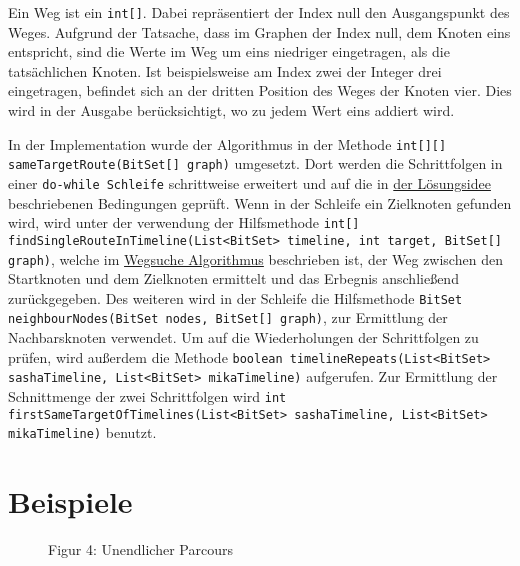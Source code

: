 \documentclass[a4paper,10pt,ngerman]{scrartcl}
\begin{document}
    Ein Weg ist ein \texttt{int[]}.
    Dabei repräsentiert der Index null den Ausgangspunkt des Weges.
    Aufgrund der Tatsache, dass im Graphen der Index null, dem Knoten eins entspricht,
    sind die Werte im Weg um eins niedriger eingetragen, als die tatsächlichen Knoten.
    Ist beispielsweise am Index zwei der Integer drei eingetragen,
    befindet sich an der dritten Position des Weges der Knoten vier.
    Dies wird in der Ausgabe berücksichtigt, wo zu jedem Wert eins addiert wird.

    In der Implementation wurde der Algorithmus in der Methode
    \texttt{int[][] sameTargetRoute(BitSet[] graph)} umgesetzt.
    Dort werden die Schrittfolgen in einer \texttt{do-while Schleife} schrittweise erweitert
    und auf die in \hyperref[sec:losungsidee]{der Lösungsidee} beschriebenen Bedingungen geprüft.
    Wenn in der Schleife ein Zielknoten gefunden wird, wird unter der verwendung der Hilfsmethode
    \texttt{int[] findSingleRouteInTimeline(List<BitSet> timeline, int target, BitSet[] graph)},
    welche im \hyperref[alg:Algorithm1]{Wegsuche Algorithmus} beschrieben ist,
    der Weg zwischen den Startknoten und dem Zielknoten ermittelt und das Erbegnis anschließend zurückgegeben.
    Des weiteren wird in der Schleife die Hilfsmethode
    \texttt{BitSet neighbourNodes(BitSet nodes, BitSet[] graph)},
    zur Ermittlung der Nachbarsknoten verwendet.
    Um auf die Wiederholungen der Schrittfolgen zu prüfen, wird außerdem die Methode
    \texttt{boolean timelineRepeats(List<BitSet> sashaTimeline, List<BitSet> mikaTimeline)} aufgerufen.
    Zur Ermittlung der Schnittmenge der zwei Schrittfolgen wird
    \texttt{int firstSameTargetOfTimelines(List<BitSet> sashaTimeline, List<BitSet> mikaTimeline)} benutzt.


    \section{Beispiele}\label{sec:beispiele}

    \begin{figure}[h!]
        \centering
        \FigurVier{}
        \caption{Figur 4: Unendlicher Parcours}
        \label{fig:Figure4}
    \end{figure}
\end{document}
